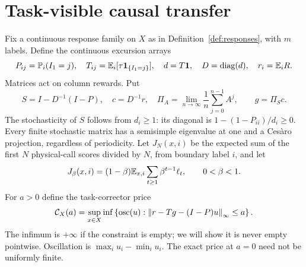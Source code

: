 \section{Task-visible causal transfer}\label{sec:transfer}
Fix a continuous response family on $X$ as in Definition~\ref{def:responses}, with $m$ labels. Define the continuous excursion arrays
\begin{equation}\label{eq:arrays}
 P_{ij}=\mathbb P_i(I_1=j),\quad T_{ij}=\mathbb E_i[\tau\mathbf 1_{\{I_1=j\}}],\quad
 d=T\mathbf 1,\quad D=\operatorname{diag}(d),\quad r_i=\mathbb E_iR.
\end{equation}
Matrices act on column rewards. Put
\begin{equation}\label{eq:time-change}
 S=I-D^{-1}(I-P),\quad c=D^{-1}r,\quad
 \Pi_A=\lim_{n\to\infty}\frac1n\sum_{j=0}^{n-1}A^j,
 \qquad g=\Pi_Sc.
\end{equation}
The stochasticity of $S$ follows from $d_i\ge1$: its diagonal is $1-(1-P_{ii})/d_i\ge0$. Every finite stochastic matrix has a semisimple eigenvalue at one and a Ces\`aro projection, regardless of periodicity. Let $J_N(x,i)$ be the expected sum of the first $N$ physical-call scores divided by $N$, from boundary label $i$, and let
\[
 J_\beta(x,i)=(1-\beta)\mathbb E_{x,i}\sum_{t\ge1}\beta^{t-1}\ell_t,
 \qquad 0<\beta<1.
\]
For $a>0$ define the task-corrector price
\begin{equation}\label{eq:corrector-price}
 \mathcal C_X(a)=\sup_{x\in X}\inf\left\{\operatorname{osc}(u):
  \left\lVert r-Tg-(I-P)u\right\rVert_\infty\le a\right\}.
\end{equation}
The infimum is $+\infty$ if the constraint is empty; we will show it is never empty pointwise. Oscillation is $\max_i u_i-\min_i u_i$. The exact price at $a=0$ need not be uniformly finite.

